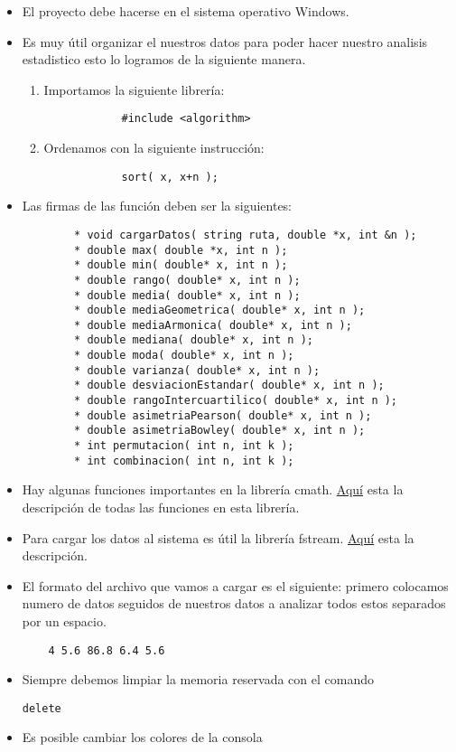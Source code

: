 \documentclass[10pt,a4paper]{article}
\begin{document}
\begin{itemize}
	\item El proyecto debe hacerse en el sistema operativo Windows.
	\item Es muy útil organizar el nuestros datos para poder hacer nuestro analisis estadistico esto lo logramos de la siguiente manera.
	\begin{enumerate}
		\item Importamos la siguiente librería:
			\begin{verbatim}
			#include <algorithm> 
			\end{verbatim}
		\item Ordenamos con la siguiente instrucción:
			\begin{verbatim}
			sort( x, x+n );
			\end{verbatim}
	\end{enumerate}
	\item Las firmas de las función deben ser la siguientes:
	\begin{verbatim} 
		* void cargarDatos( string ruta, double *x, int &n );
		* double max( double *x, int n );
		* double min( double* x, int n );
		* double rango( double* x, int n );
		* double media( double* x, int n );
		* double mediaGeometrica( double* x, int n );
		* double mediaArmonica( double* x, int n );
		* double mediana( double* x, int n );
		* double moda( double* x, int n );
		* double varianza( double* x, int n );
		* double desviacionEstandar( double* x, int n );
		* double rangoIntercuartilico( double* x, int n );
		* double asimetriaPearson( double* x, int n );
		* double asimetriaBowley( double* x, int n );
		* int permutacion( int n, int k );
		* int combinacion( int n, int k );
	\end{verbatim}
	
	\item Hay algunas funciones importantes en la librería cmath. \href{http://www.cplusplus.com/reference/cmath/}{Aquí}
	 esta la descripción de todas las funciones en esta librería.

	\item Para cargar los datos al sistema es útil la librería fstream. \href{http://www.cplusplus.com/reference/fstream/}{Aquí}
	esta la descripción.
	\item El formato del archivo que vamos a cargar es el siguiente: primero colocamos numero de datos seguidos de nuestros datos a analizar todos estos separados por un espacio.
	\begin{flushleft}
	\end{flushleft}
	\begin{verbatim}
	4 5.6 86.8 6.4 5.6
	\end{verbatim}
	\item Siempre debemos limpiar la memoria reservada con el comando \begin{verbatim}delete\end{verbatim}
	\item Es posible cambiar los colores de la consola
\end{itemize}
	
\end{document}
